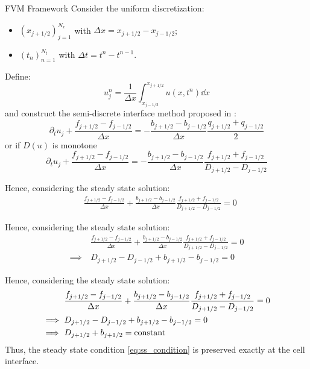 \documentclass[
    pdf,
    11pt,
    xcolor={svgnames},
  ]{beamer}
\begin{document}
\begin{frame}{FVM Framework}
    Consider the uniform discretization:
    \begin{itemize}
        \item $(x_{j+1/2})_{j=1}^{N_x}$ with $\Delta x = x_{j+1/2}-x_{j-1/2}$;
        \item $(t_n)_{n=1}^{N_t}$ with $\Delta t = t^n - t^{n-1}$.
    \end{itemize}
    \pause
    Define:
    \begin{equation*}
        u_j^n = \frac{1}{\Delta x} \int_{x_{j-1/2}}^{x_{j+1/2}} u(x,t^n) \dd{x}
    \end{equation*}
    \pause
    and construct the semi-discrete interface method proposed in \cite{Jin2001}:
    \begin{equation}
        \partial_t u_j + \frac{f_{j+1/2} - f_{j-1/2}}{\Delta x} = - \frac{b_{j+1/2} - b_{j-1/2}}{\Delta x} \frac{q_{j+1/2} + q_{j-1/2}}{2}
    \end{equation}
    \pause
    or if $D(u)$ is monotone
    \begin{equation} \label{eq:deterministic_scheme}
        \partial_t u_j + \frac{f_{j+1/2} - f_{j-1/2}}{\Delta x} = - \frac{b_{j+1/2} - b_{j-1/2}}{\Delta x} \frac{f_{j+1/2} + f_{j-1/2}}{D_{j+1/2}-D_{j-1/2}}
    \end{equation}
\end{frame}

\begin{frame}
    Hence, considering the steady state solution:
    \begin{align*}
        & 
        \frac{f_{j+1/2} - f_{j-1/2}}{\Delta x} + \frac{b_{j+1/2} - b_{j-1/2}}{\Delta x} \frac{f_{j+1/2} + f_{j-1/2}}{D_{j+1/2}-D_{j-1/2}} = 0
    \end{align*}
\end{frame}
\begin{frame}
    Hence, considering the steady state solution:
    \begin{align*}
        & 
        \frac{f_{j+1/2} - f_{j-1/2}}{\Delta x} + \frac{b_{j+1/2} - b_{j-1/2}}{\Delta x} \frac{f_{j+1/2} + f_{j-1/2}}{D_{j+1/2}-D_{j-1/2}} = 0 \\
        \implies\ 
        &
        D_{j+1/2} - D_{j-1/2} + b_{j+1/2} - b_{j-1/2} = 0
    \end{align*}
\end{frame}
\begin{frame}
    Hence, considering the steady state solution:
    \begin{align*}
        & 
        \frac{f_{j+1/2} - f_{j-1/2}}{\Delta x} + \frac{b_{j+1/2} - b_{j-1/2}}{\Delta x} \frac{f_{j+1/2} + f_{j-1/2}}{D_{j+1/2}-D_{j-1/2}} = 0 \\
        \implies\ 
        &
        D_{j+1/2} - D_{j-1/2} + b_{j+1/2} - b_{j-1/2} = 0 \\
        \implies\ 
        &
        D_{j+1/2} + b_{j+1/2} = {\rm constant}
    \end{align*}
    Thus, the steady state condition \eqref{eq:ss_condition} is preserved exactly at the cell interface.
\end{frame}
\end{document}
